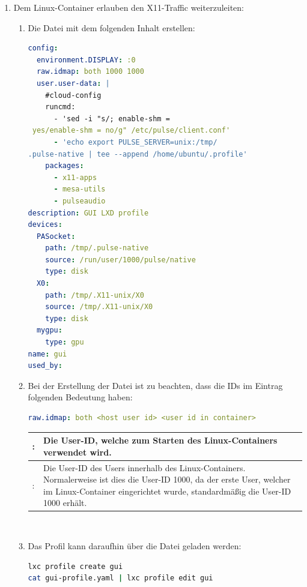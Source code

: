 \begin{enumerate}[label*=\arabic*.]
    \item Dem Linux-Container erlauben den X11-Traffic weiterzuleiten:
        \begin{enumerate}[label*=\arabic*.]
            \item Die Datei  mit dem folgenden Inhalt erstellen:
                \begin{lstlisting}[language=yaml]
config:
  environment.DISPLAY: :0
  raw.idmap: both 1000 1000
  user.user-data: |
    #cloud-config
    runcmd:
      - 'sed -i "s/; enable-shm =
 yes/enable-shm = no/g" /etc/pulse/client.conf'
      - 'echo export PULSE_SERVER=unix:/tmp/
.pulse-native | tee --append /home/ubuntu/.profile'
    packages:
      - x11-apps
      - mesa-utils
      - pulseaudio
description: GUI LXD profile
devices:
  PASocket:
    path: /tmp/.pulse-native
    source: /run/user/1000/pulse/native
    type: disk
  X0:
    path: /tmp/.X11-unix/X0
    source: /tmp/.X11-unix/X0
    type: disk
  mygpu:
    type: gpu
name: gui
used_by:
                \end{lstlisting}

                \item Bei der Erstellung der Datei  ist zu beachten, dass die IDs im Eintrag  folgenden Bedeutung haben:
                    \begin{lstlisting}[language=yaml]
raw.idmap: both <host user id> <user id in container>
                    \end{lstlisting}

                    \begin{tabular}{|>{\raggedright\arraybackslash}p{}|>{\raggedright\arraybackslash}p{}|}
                        \hline
                        <host user id>: & Die User-ID, welche zum Starten des Linux-Containers verwendet wird.\\
                        \hline
                        <user id in container>: & Die User-ID des Users innerhalb des Linux-Containers. Normalerweise ist dies die User-ID 1000, da der erste User, welcher im Linux-Container eingerichtet wurde, standardmäßig die User-ID 1000 erhält.\\
                        \hline
                    \end{tabular}\\

                \item Das Profil kann daraufhin über die Datei  geladen werden:
                    \begin{lstlisting}[language=bash]
lxc profile create gui
cat gui-profile.yaml | lxc profile edit gui
                    \end{lstlisting}
        \end{enumerate}


\end{enumerate}
